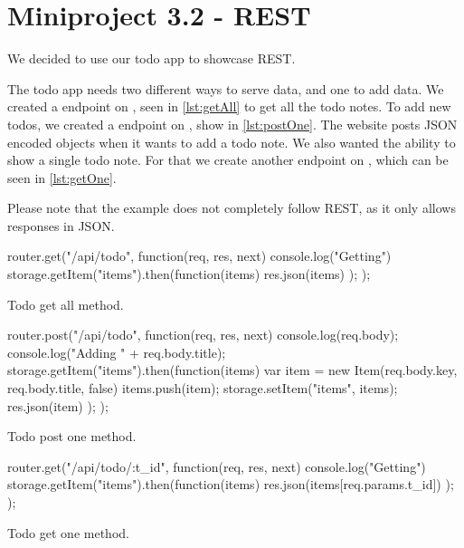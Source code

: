 \chapter{Miniproject 3.2 - REST}
We decided to use our todo app to showcase REST.

The todo app needs two different ways to serve data, and one to add data. We
created a  endpoint on , seen in
\cref{lst:getAll} to get all the todo notes. To add new todos, we created
a  endpoint on , show in \cref{lst:postOne}. The
website posts JSON encoded objects when it wants to add a todo note. We also
wanted the ability to show a single todo note. For that we create another
 endpoint on , which can be seen in
\cref{lst:getOne}.

Please note that the example does not completely follow REST, as it only allows
responses in JSON.

\begin{listing}
    \begin{js}
router.get("/api/todo", function(req, res, next) {
	console.log("Getting")
	storage.getItem("items").then(function(items) {
		res.json(items)
	});
});
    \end{js}
    \caption{Todo get all method.}\label{lst:getAll}
\end{listing}

\begin{listing}
    \begin{js}
router.post("/api/todo", function(req, res, next) {
	console.log(req.body);
	console.log("Adding " + req.body.title);
	storage.getItem("items").then(function(items) {
		var item = new Item(req.body.key, req.body.title, false)
		items.push(item);
		storage.setItem("items", items);
		res.json(item)
	});
});
    \end{js}
    \caption{Todo post one method.}\label{lst:postOne}
\end{listing}

\begin{listing}
    \begin{js}
router.get("/api/todo/:t_id", function(req, res, next) {
	console.log("Getting")
	storage.getItem("items").then(function(items) {
		res.json(items[req.params.t_id])
	});
});
    \end{js}
    \caption{Todo get one method.}
    \label{lst:getOne}
\end{listing}
